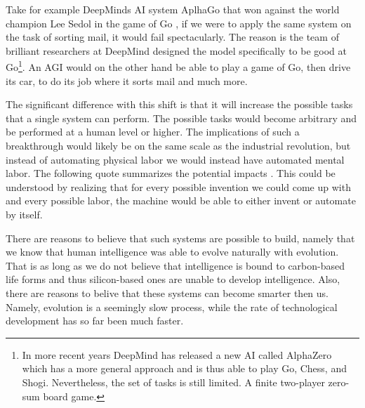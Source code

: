 \documentclass[12pt,A4]{report}
\theoremstyle{definition}
\begin{document}
Take for example DeepMinds AI system AplhaGo that won against the world champion Lee Sedol in the game of Go \autocite{DeepMind}, if we were to apply the same system on the task of sorting mail, it would fail spectacularly. The reason is the team of brilliant researchers at DeepMind designed the model specifically to be good at Go\footnote{In more recent years DeepMind has released a new AI called AlphaZero which has a more general approach and is thus able to play Go, Chess, and Shogi\autocite{Deepmind2}. Nevertheless, the set of tasks is still limited. A finite two-player zero-sum board game.}. An AGI would on the other hand be able to play a game of Go, then drive its car, to do its job where it sorts mail and much more. 

The significant difference with this shift is that it will increase the possible tasks that a single system can perform. The possible tasks would become arbitrary and be performed at a human level or higher. The implications of such a breakthrough would likely be on the same scale as the industrial revolution\autocite{Critch Kruger}, but instead of automating physical labor we would instead have automated mental labor. The following quote summarizes the potential impacts \autocite{I.J Good}. This could be understood by realizing that for every possible invention we could come up with and every possible labor, the machine would be able to either invent or automate by itself.

There are reasons to believe that such systems are possible to build, namely that we know that human intelligence was able to evolve naturally with evolution. That is as long as we do not believe that intelligence is bound to carbon-based life forms and thus silicon-based ones are unable to develop intelligence. Also, there are reasons to belive that these systems can become smarter then us. Namely, evolution is a seemingly slow process, while the rate of technological development has so far been much faster.
\end{document}
